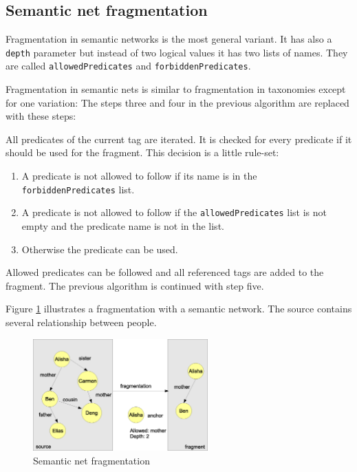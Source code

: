 \subsection{Semantic net fragmentation}
Fragmentation in semantic networks is the most general variant. It has also a {\tt depth} parameter but instead of two logical values it has two lists of names. They are called {\tt allowedPredicates} and {\tt forbiddenPredicates}. 

Fragmentation in semantic nets is similar to fragmentation in taxonomies except for one variation: The steps three and four in the previous algorithm are replaced with these steps:

All predicates of the current tag are iterated. It is checked for every predicate if it should be used for the fragment. This decision is a little rule-set:

\begin{enumerate}
    \item A predicate is not allowed to follow if its name is in the {\tt forbiddenPredicates} list.

    \item A predicate is not allowed to follow if the {\tt allowedPredicates} list is not empty and the predicate name is not in the list.

\item 
Otherwise the predicate can be used.
\end{enumerate}

Allowed predicates can be followed and all referenced tags are added to the fragment. The previous algorithm is continued with step five.

Figure \ref{fig:semanticNetFragmentation} illustrates a fragmentation with a semantic network. The source contains several relationship between people.

\begin{figure}[t]
\centering
\includegraphics[width=0.60\textwidth]{semanticNetFragmentation.eps}
\caption{Semantic net fragmentation}
\label{fig:semanticNetFragmentation}
\end{figure}

